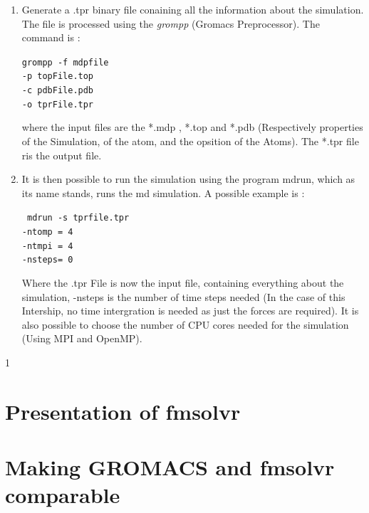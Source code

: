 \documentclass[12pt,twoside,a4paper]{report}
\begin{document}
\begin{enumerate}

\item Generate a .tpr binary file conaining all the information about the simulation. The file is processed using the \textit{grompp} (Gromacs Preprocessor). The command is :


{\centering\tt {grompp -f mdpfile \\
	 -p topFile.top \\
	 -c pdbFile.pdb \\
	 -o tprFile.tpr \\ 
 }}

\vspace{5mm}
where the input files are the *.mdp , *.top and *.pdb (Respectively properties of the Simulation, of the atom, and the opsition of the Atoms). The *.tpr file ris the output file.

\item It is then possible to run the simulation using the program mdrun, which as its name stands, runs the md simulation. A possible example is :

{\centering\tt { mdrun -s tprfile.tpr \\
				 -ntomp = 4  			\\		
				 -ntmpi = 4				 \\
				 -nsteps= 0     		  \\  
 }}
 
\vspace{5mm}

Where the .tpr File is now the input file, containing everything about the simulation, -nsteps is the number of time steps needed (In the case of this Intership, no time intergration is needed as just the forces are required). It is also possible to choose the number of CPU cores needed for the simulation (Using MPI and OpenMP).

\end{enumerate}	
	
	
	1
\section{Presentation of fmsolvr}	




	
\section{Making GROMACS and fmsolvr comparable}	
\end{document}
